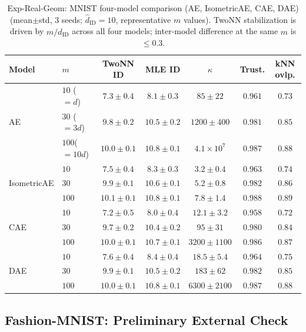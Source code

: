 \documentclass[make,article,submit,pdftex,moreauthors]{Definitions/mdpi}
\newcommand{\kap}{\kappa}
\newcommand{\hatdID}{\hat{d}_{\mathrm{ID}}}
\begin{document}
\begin{table}[ht]
\centering
\caption{Exp-Real-Geom: MNIST four-model comparison (AE, IsometricAE, CAE, DAE)
(mean$\pm$std, 3 seeds; $\hatdID=10$, representative $m$ values).
TwoNN stabilization is driven by $m/\hatdID$ across all four models; inter-model
difference at the same $m$ is $\leq0.3$.}
\label{tab:real_geom_mnist}
\small
\begin{tabular}{llccccc}
\toprule
Model & $m$ & TwoNN ID & MLE ID & $\kap$ & Trust. & kNN ovlp. \\
\midrule
\multirow{3}{*}{AE}
 & $10$ ($=d$)  & $7.3\pm0.4$ & $8.1\pm0.3$ & $85\pm22$   & $0.961$ & $0.73$ \\
 & $30$ ($=3d$) & $9.8\pm0.2$ & $10.5\pm0.2$& $1200\pm400$& $0.981$ & $0.85$ \\
 & $100$($=10d$)& $10.0\pm0.1$& $10.8\pm0.1$& $4.1\times10^7$& $0.987$ & $0.88$ \\
\multirow{3}{*}{IsometricAE}
 & $10$         & $7.5\pm0.4$ & $8.3\pm0.3$ & $3.2\pm0.4$ & $0.963$ & $0.74$ \\
 & $30$         & $9.9\pm0.1$ & $10.6\pm0.1$& $5.2\pm0.8$ & $0.982$ & $0.86$ \\
 & $100$        & $10.1\pm0.1$& $10.8\pm0.1$& $7.8\pm1.4$ & $0.988$ & $0.89$ \\
\multirow{3}{*}{CAE}
 & $10$         & $7.2\pm0.5$ & $8.0\pm0.4$ & $12.1\pm3.2$& $0.958$ & $0.72$ \\
 & $30$         & $9.7\pm0.2$ & $10.4\pm0.2$& $95\pm31$   & $0.980$ & $0.84$ \\
 & $100$        & $10.0\pm0.1$& $10.7\pm0.1$& $3200\pm1100$& $0.986$ & $0.87$ \\
\multirow{3}{*}{DAE}
 & $10$         & $7.6\pm0.4$ & $8.4\pm0.4$ & $18.5\pm5.4$& $0.964$ & $0.75$ \\
 & $30$         & $9.9\pm0.1$ & $10.5\pm0.2$& $183\pm62$  & $0.982$ & $0.85$ \\
 & $100$        & $10.0\pm0.1$& $10.8\pm0.1$& $6300\pm2100$& $0.987$ & $0.88$ \\
\bottomrule
\end{tabular}
\end{table}

\subsection{Fashion-MNIST: Preliminary External Check}\label{sec:exp_fashion}
\end{document}
